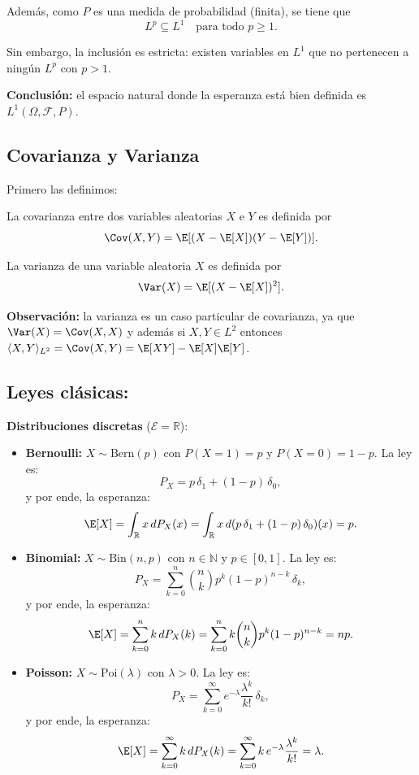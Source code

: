 Además, como $P$ es una medida de probabilidad (finita), se tiene que
\[
L^p \subseteq L^1 \quad \text{para todo } p \geq 1.
\]

Sin embargo, la inclusión es estricta: existen variables en $L^1$ que no pertenecen a ningún $L^p$ con $p > 1$.

\medskip

\noindent
\textbf{Conclusión:} el espacio natural donde la esperanza está bien definida es $L^1(\Omega,\mathcal{F},P)$.

\subsection{Covarianza y Varianza}

Primero las definimos:

\begin{defi}[Covarianza]
La covarianza entre dos variables aleatorias $X$ e $Y$ es definida por
\[  \Cov(X,Y) = \E[(X - \E[X])(Y - \E[Y])]. \]
\end{defi}    

\begin{defi}[Varianza]
La varianza de una variable aleatoria $X$ es definida por
\[  \Var(X) = \E[(X - \E[X])^2]. \]
\end{defi}    

\textbf{Observación:} la varianza es un caso particular de covarianza, ya que $\Var(X) = \Cov(X,X)$ y además si $X, Y \in L^2$ entonces $\langle X,Y\rangle_{L^2} = \Cov(X,Y) = \E[XY] - \E[X]\E[Y]$.

\subsection{Leyes clásicas:}

\textbf{Distribuciones discretas} ($\mathcal{E} = \mathbb{R}$):

\begin{itemize}
\item \textbf{Bernoulli:} $X \sim \text{Bern}(p)$ con $P(X=1) = p$ y $P(X=0) = 1-p$. La ley es:
\[
P_X = p\,\delta_1 + (1-p)\,\delta_0,
\]
y por ende, la esperanza:
\[
\E[X] = \int_{\mathbb{R}} x \, dP_X(x) = \int_{\mathbb{R}} x \, d(p\,\delta_1 + (1-p)\,\delta_0)(x) = p.
\]

\item \textbf{Binomial:} $X \sim \text{Bin}(n,p)$ con $n \in \mathbb{N}$ y $p \in [0,1]$. La ley es:
\[
P_X = \sum_{k=0}^{n} \binom{n}{k} p^k (1-p)^{n-k} \, \delta_k,
\]
y por ende, la esperanza:
\[
\E[X] = \sum_{k=0}^{n} k \, dP_X(k) = \sum_{k=0}^{n} k \binom{n}{k} p^k (1-p)^{n-k} = np.
\]

\item \textbf{Poisson:} $X \sim \text{Poi}(\lambda)$ con $\lambda > 0$. La ley es:
\[
P_X = \sum_{k=0}^{\infty} e^{-\lambda} \frac{\lambda^k}{k!} \, \delta_k,
\]
y por ende, la esperanza:
\[
\E[X] = \sum_{k=0}^{\infty} k \, dP_X(k) = \sum_{k=0}^{\infty} k \, e^{-\lambda} \frac{\lambda^k}{k!} = \lambda.
\]
\end{itemize}

